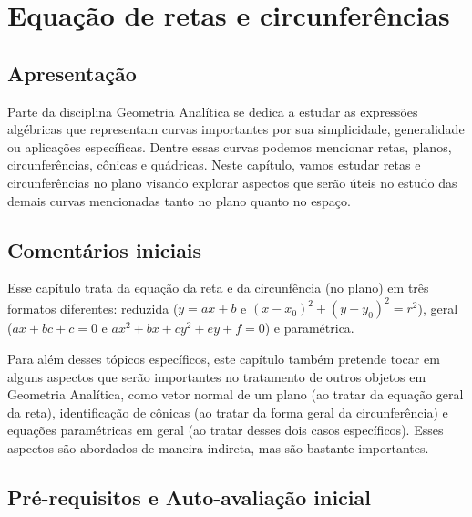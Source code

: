 \documentclass[main.tex]{subfiles}
\begin{document}
\paraAmbos

\chapter{Equação de retas e circunferências}

\paraAlunos

\section{Apresentação}

Parte da disciplina Geometria Analítica se dedica a estudar as expressões algébricas que representam curvas importantes por sua simplicidade, generalidade ou aplicações específicas. Dentre essas curvas podemos mencionar retas, planos, circunferências, cônicas e quádricas. Neste capítulo, vamos estudar retas e circunferências no plano visando explorar aspectos que serão úteis no estudo das demais curvas mencionadas tanto no plano quanto no espaço.

\paraTutores

\section{Comentários iniciais}

Esse capítulo trata da equação da reta e da circunfência (no plano) em três formatos diferentes: reduzida ($y=ax+b$ e $(x-x_0)^2+(y-y_0)^2=r^2$), geral ($ax+bc+c=0$ e $ax^2+bx+cy^2+ey+f=0$) e paramétrica.

Para além desses tópicos específicos, este capítulo também pretende tocar em alguns aspectos que serão importantes no tratamento de outros objetos em Geometria Analítica, como vetor normal de um plano (ao tratar da equação geral da reta), identificação de cônicas (ao tratar da forma geral da circunferência) e equações paramétricas em geral (ao tratar desses dois casos específicos). Esses aspectos são abordados de maneira indireta, mas são bastante importantes.

\paraAmbos

\section{Pré-requisitos e Auto-avaliação inicial}
\end{document}
